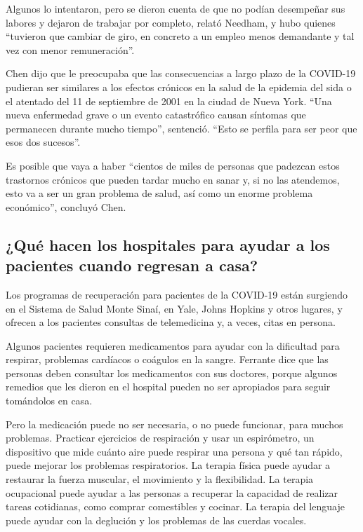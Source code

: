 Algunos lo intentaron, pero se dieron cuenta de que no podían desempeñar
sus labores y dejaron de trabajar por completo, relató Needham, y hubo
quienes ``tuvieron que cambiar de giro, en concreto a un empleo menos
demandante y tal vez con menor remuneración''.

Chen dijo que le preocupaba que las consecuencias a largo plazo de la
COVID-19 pudieran ser similares a los efectos crónicos en la salud de la
epidemia del sida o el atentado del 11 de septiembre de 2001 en la
ciudad de Nueva York. ``Una nueva enfermedad grave o un evento
catastrófico causan síntomas que permanecen durante mucho tiempo'',
sentenció. ``Esto se perfila para ser peor que esos dos sucesos''.

Es posible que vaya a haber ``cientos de miles de personas que padezcan
estos trastornos crónicos que pueden tardar mucho en sanar y, si no las
atendemos, esto va a ser un gran problema de salud, así como un enorme
problema económico'', concluyó Chen.

\hypertarget{quuxe9-hacen-los-hospitales-para-ayudar-a-los-pacientes-cuando-regresan-a-casa}{%
\subsection{¿Qué hacen los hospitales para ayudar a los pacientes cuando
regresan a
casa?}\label{quuxe9-hacen-los-hospitales-para-ayudar-a-los-pacientes-cuando-regresan-a-casa}}

Los programas de recuperación para pacientes de la COVID-19 están
surgiendo en el Sistema de Salud Monte Sinaí, en Yale, Johns Hopkins y
otros lugares, y ofrecen a los pacientes consultas de telemedicina y, a
veces, citas en persona.

Algunos pacientes requieren medicamentos para ayudar con la dificultad
para respirar, problemas cardíacos o coágulos en la sangre. Ferrante
dice que las personas deben consultar los medicamentos con sus doctores,
porque algunos remedios que les dieron en el hospital pueden no ser
apropiados para seguir tomándolos en casa.

Pero la medicación puede no ser necesaria, o no puede funcionar, para
muchos problemas. Practicar ejercicios de respiración y usar un
espirómetro, un dispositivo que mide cuánto aire puede respirar una
persona y qué tan rápido, puede mejorar los problemas respiratorios. La
terapia física puede ayudar a restaurar la fuerza muscular, el
movimiento y la flexibilidad. La terapia ocupacional puede ayudar a las
personas a recuperar la capacidad de realizar tareas cotidianas, como
comprar comestibles y cocinar. La terapia del lenguaje puede ayudar con
la deglución y los problemas de las cuerdas vocales.

